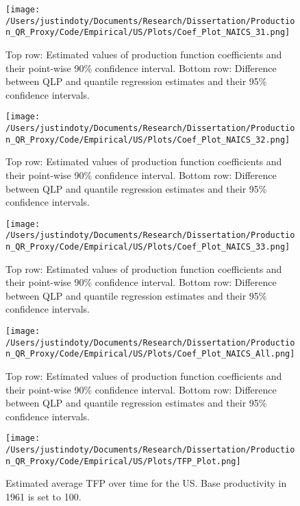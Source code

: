 \documentclass[11pt]{article}
\begin{document}
\begin{figure}[H]
\centering
\texttt{[image: /Users/justindoty/Documents/Research/Dissertation/Production\_QR\_Proxy/Code/Empirical/US/Plots/Coef\_Plot\_NAICS\_31.png]}
\caption{Top row: Estimated values of production function coefficients and their point-wise 90\% confidence interval. Bottom row: Difference between QLP and quantile regression estimates and their 95\% confidence intervals.}
\label{fig:31coef}
\end{figure}

\begin{figure}[H]
\centering
\texttt{[image: /Users/justindoty/Documents/Research/Dissertation/Production\_QR\_Proxy/Code/Empirical/US/Plots/Coef\_Plot\_NAICS\_32.png]}
\caption{Top row: Estimated values of production function coefficients and their point-wise 90\% confidence interval. Bottom row: Difference between QLP and quantile regression estimates and their 95\% confidence intervals.}
\label{fig:32coef}
\end{figure}

\begin{figure}[H]
\centering
\texttt{[image: /Users/justindoty/Documents/Research/Dissertation/Production\_QR\_Proxy/Code/Empirical/US/Plots/Coef\_Plot\_NAICS\_33.png]}
\caption{Top row: Estimated values of production function coefficients and their point-wise 90\% confidence interval. Bottom row: Difference between QLP and quantile regression estimates and their 95\% confidence intervals.}
\label{fig:33coef}
\end{figure}

\begin{figure}[H]
\centering
\texttt{[image: /Users/justindoty/Documents/Research/Dissertation/Production\_QR\_Proxy/Code/Empirical/US/Plots/Coef\_Plot\_NAICS\_All.png]}
\caption{Top row: Estimated values of production function coefficients and their point-wise 90\% confidence interval. Bottom row: Difference between QLP and quantile regression estimates and their 95\% confidence intervals.}
\label{fig:USallcoef}
\end{figure}

\begin{figure}[H]
\centering
\texttt{[image: /Users/justindoty/Documents/Research/Dissertation/Production\_QR\_Proxy/Code/Empirical/US/Plots/TFP\_Plot.png]}
\caption{Estimated average TFP over time for the US. Base productivity in 1961 is set to 100.}
\end{figure}
\end{document}
